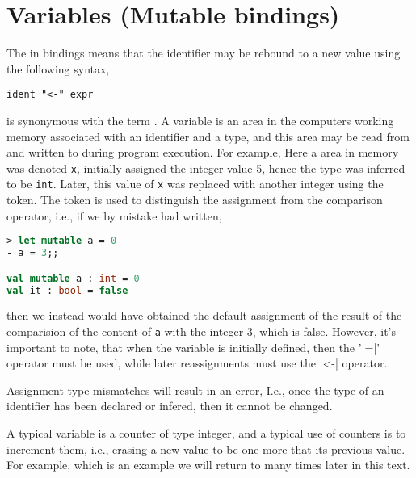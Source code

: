 \section{Variables (Mutable bindings)}
\label{sec:mutableValues}
The  in  bindings means that the identifier may be rebound to a new value using the following syntax,
%
\begin{lstlisting}[language=EBNF]
ident "<-" expr
\end{lstlisting}
 is synonymous with the term . A variable is an area in the computers working memory associated with an identifier and a type, and this area may be read from and written to during program execution. For example,
%
%
Here a area in memory was denoted \texttt{x}, initially assigned the integer value 5, hence the type was inferred to be \lstinline|int|.  Later, this value of \texttt{x} was replaced with another integer using the \idx{\token{<-}} token. The \token{<-} token is used to distinguish the assignment from the comparison operator, i.e., if we by mistake had written,
%
\begin{lstlisting}[language=fsharp,caption={fsharpi, example of changing the content of a variable.}]
> let mutable a = 0
- a = 3;;

val mutable a : int = 0
val it : bool = false
\end{lstlisting}
%
then we instead would have obtained the default assignment of the result of the comparision of the content of \lstinline|a| with the integer 3, which is false. However, it's important to note, that when the variable is initially defined, then the '\token|=|' operator must be used, while later reassignments must use the \token|<-|  operator. 

Assignment type mismatches will result in an error, 
%
%
I.e., once the type of an identifier has been declared or infered, then it cannot be changed.

A typical variable is a counter of type integer, and a typical use of counters is to increment them, i.e., erasing a new value to be one more that its previous value. For example,
%
%
which is an example we will return to many times later in this text.


